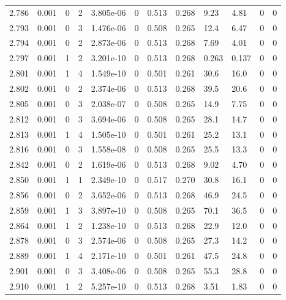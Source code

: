 \documentclass[preview]{standalone}
\begin{document}
{{{{{{{\begin{tabular}{L{1.2cm}C{1.2cm} C{0.3cm}C{0.5cm} C{1.4cm}C{1.4cm} C{1.4cm}C{1.4cm} C{1.6cm}C{1.6cm} C{1.6cm}C{1.6cm}}
  2.786  &  0.001  & 0     &  2 &  3.805e-06  & 0  &  0.513&   0.268& 9.23 & 4.81   &  0 & 0  \\ 
  2.793  &  0.001  & 0     &  3 &  1.476e-06  & 0  &  0.508&   0.265& 12.4 & 6.47   &  0 & 0  \\ 
  2.794  &  0.001  & 0     &  2 &  2.873e-06  & 0  &  0.513&   0.268& 7.69 & 4.01   &  0 & 0  \\ 
  2.797  &  0.001  & 1     &  2 &  3.201e-10  & 0  &  0.513&   0.268& 0.263 & 0.137   &  0 & 0  \\ 
  2.801  &  0.001  & 1     &  4 &  1.549e-10  & 0  &  0.501&   0.261& 30.6 & 16.0   &  0 & 0  \\ 
  2.802  &  0.001  & 0     &  2 &  2.374e-06  & 0  &  0.513&   0.268& 39.5 & 20.6   &  0 & 0  \\ 
  2.805  &  0.001  & 0     &  3 &  2.038e-07  & 0  &  0.508&   0.265& 14.9 & 7.75   &  0 & 0  \\ 
  2.812  &  0.001  & 0     &  3 &  3.694e-06  & 0  &  0.508&   0.265& 28.1 & 14.7   &  0 & 0  \\ 
  2.813  &  0.001  & 1     &  4 &  1.505e-10  & 0  &  0.501&   0.261& 25.2 & 13.1   &  0 & 0  \\ 
  2.816  &  0.001  & 0     &  3 &  1.558e-08  & 0  &  0.508&   0.265& 25.5 & 13.3   &  0 & 0  \\ 
  2.842  &  0.001  & 0     &  2 &  1.619e-06  & 0  &  0.513&   0.268& 9.02 & 4.70   &  0 & 0  \\ 
  2.850  &  0.001  & 1     &  1 &  2.349e-10  & 0  &  0.517&   0.270& 30.8 & 16.1   &  0 & 0  \\ 
  2.856  &  0.001  & 0     &  2 &  3.652e-06  & 0  &  0.513&   0.268& 46.9 & 24.5   &  0 & 0  \\ 
  2.859  &  0.001  & 1     &  3 &  3.897e-10  & 0  &  0.508&   0.265& 70.1 & 36.5   &  0 & 0  \\ 
  2.864  &  0.001  & 1     &  2 &  1.238e-10  & 0  &  0.513&   0.268& 22.9 & 12.0   &  0 & 0  \\ 
  2.878  &  0.001  & 0     &  3 &  2.574e-06  & 0  &  0.508&   0.265& 27.3 & 14.2   &  0 & 0  \\ 
  2.889  &  0.001  & 1     &  4 &  2.171e-10  & 0  &  0.501&   0.261& 47.5 & 24.8   &  0 & 0  \\ 
  2.901  &  0.001  & 0     &  3 &  3.408e-06  & 0  &  0.508&   0.265& 55.3 & 28.8   &  0 & 0  \\ 
  2.910  &  0.001  & 1     &  2 &  5.257e-10  & 0  &  0.513&   0.268& 3.51 & 1.83   &  0 & 0  \\ 

\end{tabular}}}}}}}}
\end{document}
